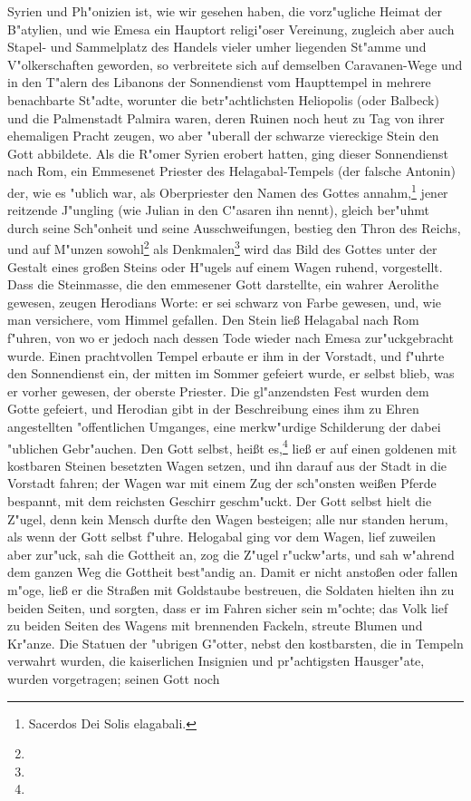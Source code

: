 \documentclass[a4paper, 11pt, oneside, polutonikogreek, german]{article}
\begin{document}
Syrien und Ph"onizien ist, wie wir gesehen haben, die vorz"ugliche Heimat der B"atylien, und wie Emesa ein Hauptort religi"oser Vereinung, zugleich aber auch Stapel- und Sammelplatz des Handels vieler umher liegenden St"amme und V"olkerschaften geworden, so verbreitete sich auf demselben Caravanen-Wege und in den T"alern des Libanons der Sonnendienst vom Haupttempel in mehrere benachbarte St"adte, worunter die betr"achtlichsten Heliopolis (oder Balbeck) und die Palmenstadt Palmira waren, deren Ruinen noch heut zu Tag von ihrer ehemaligen Pracht zeugen, wo aber "uberall der schwarze viereckige Stein den Gott abbildete. Als die R"omer Syrien erobert hatten, ging dieser Sonnendienst nach Rom, ein Emmesenet Priester des Helagabal-Tempels (der falsche Antonin) der, wie es "ublich war, als Oberpriester den Namen des Gottes annahm,\footnote{Sacerdos Dei Solis elagabali.} jener reitzende J"ungling (wie Julian in den C"asaren ihn nennt), gleich ber"uhmt durch seine Sch"onheit und seine Ausschweifungen, bestieg den Thron des Reichs, und auf M"unzen sowohl\footnote{} als Denkmalen\footnote{} wird das Bild des Gottes unter der Gestalt eines großen Steins oder H"ugels auf einem Wagen ruhend, vorgestellt. Dass die Steinmasse, die den emmesener Gott darstellte, ein wahrer Aerolithe gewesen, zeugen Herodians Worte: er sei schwarz von Farbe gewesen, und, wie man versichere, vom Himmel gefallen. Den Stein ließ Helagabal nach Rom f"uhren, von wo er jedoch nach dessen Tode wieder nach Emesa zur"uckgebracht wurde. Einen prachtvollen Tempel erbaute er ihm in der Vorstadt, und f"uhrte den Sonnendienst ein, der mitten im Sommer gefeiert wurde, er selbst blieb, was er vorher gewesen, der oberste Priester. Die gl"anzendsten Fest wurden dem Gotte gefeiert, und Herodian gibt in der Beschreibung eines ihm zu Ehren angestellten "offentlichen Umganges, eine merkw"urdige Schilderung der dabei "ublichen Gebr"auchen. Den Gott selbst, heißt es,\footnote{} ließ er auf einen goldenen mit kostbaren Steinen besetzten Wagen setzen, und ihn darauf aus der Stadt in die Vorstadt fahren; der Wagen war mit einem Zug der sch"onsten weißen Pferde bespannt, mit dem reichsten Geschirr geschm"uckt. Der Gott selbst hielt die Z"ugel, denn kein Mensch durfte den Wagen besteigen; alle nur standen herum, als wenn der Gott selbst f"uhre. Helogabal ging vor dem Wagen, lief zuweilen aber zur"uck, sah die Gottheit an, zog die Z"ugel r"uckw"arts, und sah w"ahrend dem ganzen Weg die Gottheit best"andig an. Damit er nicht anstoßen oder fallen m"oge, ließ er die Straßen mit Goldstaube bestreuen, die Soldaten hielten ihn zu beiden Seiten, und sorgten, dass er im Fahren sicher sein m"ochte; das Volk lief zu beiden Seiten des Wagens mit brennenden Fackeln, streute Blumen und Kr"anze. Die Statuen der "ubrigen G"otter, nebst den kostbarsten, die in Tempeln verwahrt wurden, die kaiserlichen Insignien und pr"achtigsten Hausger"ate, wurden vorgetragen; seinen Gott noch 
\end{document}
